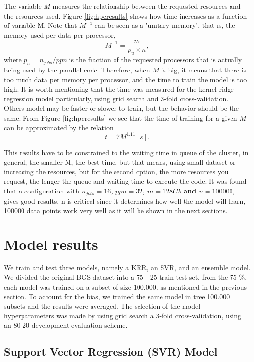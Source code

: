 The variable $M$ measures the relationship between the requested resources and the resources used. Figure \ref{fig:hpcresults} shows how time increases as a function of variable M. Note that $M^{-1}$ can be seen as a 'unitary memory', that is, the memory used per data per processor,
\begin{equation*}
M^{-1} = \frac{m}{p_u \times n},
\end{equation*}
where $p_u = n_{jobs}/ppn$ is the fraction of the requested processors that is actually being used by the parallel code. Therefore, when $M$ is big, it means that there is too much data per memory per processor, and the time to train the model is too high. It is worth mentioning that the time was measured for the kernel ridge regression model particularly, using grid search and 3-fold cross-validation. Others model may be faster or slower to train, but the behavior should be the same. From Figure \ref{fig:hpcresults} we see that the time of training for a given $M$ can be approximated by the relation
\begin{equation}
t = 7M^{1.11} [s].
\end{equation}

This results have to be constrained to the waiting time in queue of the cluster, in general, the smaller M, the best time, but that means, using small dataset or increasing the resources, but for the second option, the more resources you request, the longer the queue and waiting time to execute the code. It was found that a configuration with \textbf{$n_{jobs} = 16$, $ppn = 32$, $m = 128 Gb$ and $n = 100000$}, gives good results. n is critical since it determines how well the model will learn, 100000 data points work very well as it will be shown in the next sections.  

\section{Model results}

We train and test three models, namely a KRR, an SVR, and an ensemble model. We divided the original BGS dataset into a 75 - 25 train-test set, from the 75 \%, each model was trained on a subset of size 100.000, as mentioned in the previous section. To account for the bias, we trained the same model in tree 100.000 subsets and the results were averaged. The selection of the model hyperparameters was made by using grid search a 3-fold cross-validation, using an 80-20 development-evaluation scheme. 

\subsection{Support Vector Regression (SVR) Model}

